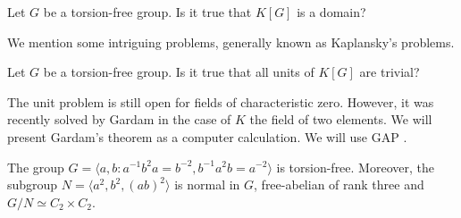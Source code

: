 \begin{problem}
	\label{prob:dominio}
	Let $G$ be a torsion-free group. Is it true that 
	$K[G]$ is a domain?
\end{problem}



We mention some intriguing problems, generally known as Kaplansky's problems. 

\begin{problem}[Units]
	\label{prob:units}
	Let $G$ be a torsion-free group. Is it true that all units of $K[G]$ are
	trivial?
\end{problem}

The unit problem is still open for fields of characteristic zero. 
However, it was recently solved by Gardam \cite{MR4334981} 
in the case of 
$K$ the field of two elements. We will present Gardam's theorem 
as a computer calculation. We will use \textsf{GAP} \cite{GAP4}.  

\begin{lemma}
    The group $G=\langle a,b:a^{-1}b^2a=b^{-2},b^{-1}a^2b=a^{-2}\rangle$
    is torsion-free. Moreover, the subgroup $N=\langle a^2,b^2,(ab)^2\rangle$ is normal in $G$, 
    free-abelian of rank three and $G/N\simeq C_2\times C_2$.
\end{lemma}

